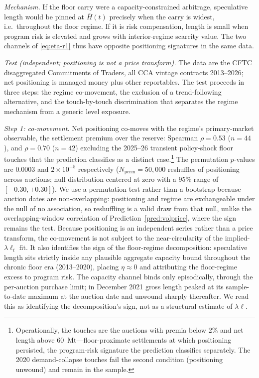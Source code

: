 \documentclass[11pt,letterpaper]{article}
\theoremstyle{plain}
\theoremstyle{definition}
\numberwithin{equation}{section}
\begin{document}
\noindent\emph{Mechanism.} If the floor carry were a capacity-constrained arbitrage, speculative length would be pinned at $\bar H(t)$ precisely when the carry is widest, i.e.\ throughout the floor regime. If it is risk compensation, length is small when program risk is elevated and grows with interior-regime scarcity value. The two channels of \eqref{eq:eta-r1} thus have opposite positioning signatures in the same data.

\emph{Test (independent; positioning is not a price transform).} The data are the CFTC disaggregated Commitments of Traders, all CCA vintage contracts 2013--2026; net positioning is managed money plus other reportables. The test proceeds in three steps: the regime co-movement, the exclusion of a trend-following alternative, and the touch-by-touch discrimination that separates the regime mechanism from a generic level exposure.

\emph{Step 1: co-movement.} Net positioning co-moves with the regime's primary-market observable, the settlement premium over the reserve: Spearman $\rho=0.53$ ($n=44$), and $\rho=0.70$ ($n=42$) excluding the 2025--26 transient policy-shock floor touches that the prediction classifies as a distinct case.\footnote{Operationally, the touches are the auctions with premia below $2\%$ and net length above $60$~Mt---floor-proximate settlements at which positioning persisted, the program-risk signature the prediction classifies separately. The 2020 demand-collapse touches fail the second condition (positioning unwound) and remain in the sample.} The permutation $p$-values are $0.0003$ and $2\times10^{-5}$ respectively ($N_{\mathrm{perm}}=50{,}000$ reshuffles of positioning across auctions; null distribution centered at zero with a $95\%$ range of $[-0.30,+0.30]$). We use a permutation test rather than a bootstrap because auction dates are non-overlapping: positioning and regime are exchangeable under the null of no association, so reshuffling is a valid draw from that null, unlike the overlapping-window correlation of Prediction~\ref{pred:volprice}, where the sign remains the test. Because positioning is an independent series rather than a price transform, the co-movement is not subject to the near-circularity of the implied-$\lambda\ell_t$ fit. It also identifies the sign of the floor-regime decomposition: speculative length sits strictly inside any plausible aggregate capacity bound throughout the chronic floor era (2013--2020), placing $\eta\approx0$ and attributing the floor-regime excess to program risk. The capacity channel binds only episodically, through the per-auction purchase limit; in December 2021 gross length peaked at its sample-to-date maximum at the auction date and unwound sharply thereafter. We read this as identifying the decomposition's sign, not as a structural estimate of $\lambda\ell$.
\end{document}
